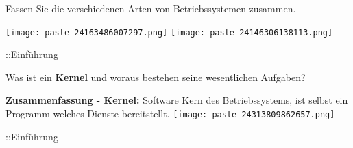 \documentclass{article}
\begin{document}
\begin{tcolorbox}[colback=white!10!white,colframe=lightgray!75!black,
  savelowerto=\jobname_ex.tex]

\begin{center}
Fassen Sie die verschiedenen Arten von Betriebssystemen zusammen.

\end{center}

\tcblower

\justifying
\texttt{[image: paste-24163486007297.png]}
\texttt{[image: paste-24146306138113.png]}

\end{tcolorbox}
\begin{tcolorbox}[colback=white!10!white,colframe=lightgray!75!black,
  savelowerto=\jobname_ex.tex]

\begin{center}
::Einführung

\end{center}

\tcblower

\justifying

\end{tcolorbox}
\begin{tcolorbox}[colback=white!10!white,colframe=lightgray!75!black,
  savelowerto=\jobname_ex.tex]

\begin{center}
Was ist ein 
\textbf{Kernel
}und woraus bestehen seine wesentlichen Aufgaben?

\end{center}

\tcblower

\justifying
\textbf{Zusammenfassung - Kernel:
}Software Kern des Betriebssystems, ist selbst ein Programm welches Dienste bereitstellt.
\texttt{[image: paste-24313809862657.png]}

\end{tcolorbox}
\begin{tcolorbox}[colback=white!10!white,colframe=lightgray!75!black,
  savelowerto=\jobname_ex.tex]

\begin{center}
::Einführung

\end{center}

\tcblower

\justifying

\end{tcolorbox}
\end{document}
